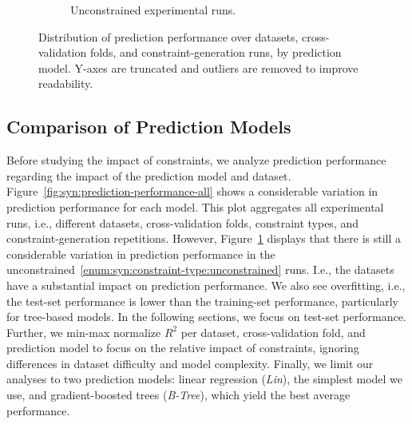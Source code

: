 \begin{figure}[t]
\begin{subfigure}{0.48\textwidth}
		\caption{Unconstrained experimental runs.}
		\label{fig:syn:prediction-performance-unconstrained}
	\end{subfigure}
	\caption{
		Distribution of prediction performance over datasets, cross-validation folds, and constraint-generation runs, by prediction model.
		Y-axes are truncated and outliers are removed to improve readability.
	}
	\label{fig:syn:prediction-performance}
\end{figure}

\subsection{Comparison of Prediction Models}
\label{sec:syn:evaluation:prediction}

Before studying the impact of constraints, we analyze prediction performance regarding the impact of the prediction model and dataset.
Figure~\ref{fig:syn:prediction-performance-all} shows a considerable variation in prediction performance for each model.
This plot aggregates all experimental runs, i.e., different datasets, cross-validation folds, constraint types, and constraint-generation repetitions.
However, Figure~\ref{fig:syn:prediction-performance-unconstrained} displays that there is still a considerable variation in prediction performance in the unconstrained~\ref{enum:syn:constraint-type:unconstrained} runs.
I.e., the datasets have a substantial impact on prediction performance.
We also see overfitting, i.e., the test-set performance is lower than the training-set performance, particularly for tree-based models.
In the following sections, we focus on test-set performance.
Further, we min-max normalize $R^2$ per dataset, cross-validation fold, and prediction model to focus on the relative impact of constraints, ignoring differences in dataset difficulty and model complexity.
Finally, we limit our analyses to two prediction models:
linear regression (\emph{Lin}), the simplest model we use, and gradient-boosted trees (\emph{B-Tree}), which yield the best average performance.

